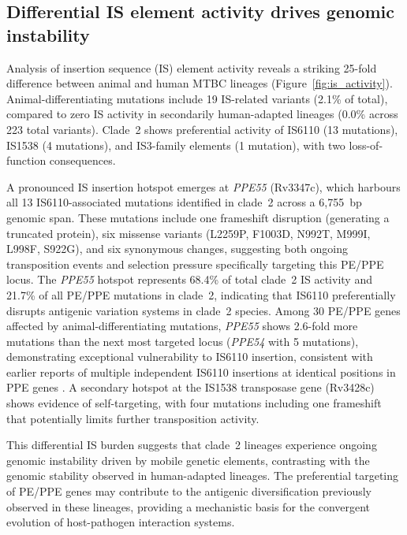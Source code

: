 \documentclass[11pt,a4paper]{article}
\begin{document}
\subsection{Differential IS element activity drives genomic instability}
\label{sec:results:is_elements}

Analysis of insertion sequence (IS) element activity reveals a striking 25-fold
difference between animal and human MTBC lineages (Figure~\ref{fig:is_activity}).
Animal-differentiating mutations include 19 IS-related variants (2.1\% of total),
compared to zero IS activity in secondarily human-adapted lineages (0.0\% across 223 total variants).
%
Clade~2 shows preferential activity of IS6110 (13 mutations), IS1538
(4 mutations), and IS3-family elements (1 mutation), with two loss-of-function
consequences.

A pronounced IS insertion hotspot emerges at \textit{PPE55} (Rv3347c), which
harbours all 13 IS6110-associated mutations identified in clade~2
across a 6{,}755~bp genomic span.
%
These mutations include one frameshift disruption (generating a truncated protein),
six missense variants (L2259P, F1003D, N992T, M999I, L998F, S922G), and six
synonymous changes, suggesting both ongoing transposition events and selection
pressure specifically targeting this PE/PPE locus.
%
The \textit{PPE55} hotspot represents 68.4\% of total clade~2 IS activity and
21.7\% of all PE/PPE mutations in clade~2, indicating that IS6110
preferentially disrupts antigenic variation systems in clade~2 species.
%
Among 30 PE/PPE genes affected by animal-differentiating mutations, \textit{PPE55}
shows 2.6-fold more mutations than the next most targeted locus (\textit{PPE54}
with 5 mutations), demonstrating exceptional vulnerability to IS6110 insertion,
consistent with earlier reports of multiple independent IS6110 insertions at
identical positions in PPE genes \cite{McEvoy2009}.
%
A secondary hotspot at the IS1538 transposase gene (Rv3428c) shows evidence of
self-targeting, with four mutations including one frameshift that potentially
limits further transposition activity.

This differential IS burden suggests that clade~2 lineages experience
ongoing genomic instability driven by mobile genetic elements, contrasting with
the genomic stability observed in human-adapted lineages. The preferential targeting
of PE/PPE genes may contribute to the antigenic diversification previously observed
in these lineages, providing a mechanistic basis for the convergent evolution of
host-pathogen interaction systems.
\end{document}
